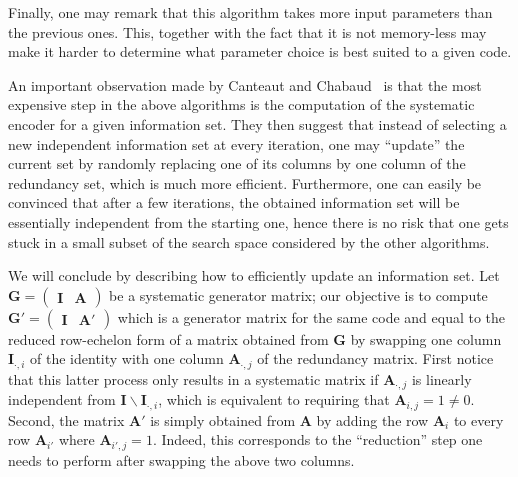 \documentclass[11pt,a4paper]{article}
\theoremstyle{definition}
\begin{document}
Finally, one may remark that this algorithm takes more input parameters than the previous ones. This, together with the fact that it is not memory-less may make it harder to
determine what parameter choice is best suited to a given code.

\medskip

An important observation made by Canteaut and Chabaud~\cite{CanteautChabaud} is that the most expensive step in the above algorithms is the computation of the systematic encoder for a given
information set. They then suggest that instead of selecting a new independent information set at every iteration, one may ``update'' the current set by randomly replacing one
of its columns by one column of the redundancy set, which is much more efficient. Furthermore, one can easily be convinced that after a few iterations, the obtained information
set will be essentially independent from the starting one, hence there is no risk that one gets stuck in a small subset of the search space considered by the other algorithms.

We will conclude by describing how to efficiently update an information set. Let $\bm{G} = \begin{pmatrix}\bm{I} & \bm{A}\end{pmatrix}$ be a systematic generator matrix;
our objective is to compute $\bm{G}' = \begin{pmatrix}\bm{I} & \bm{A}'\end{pmatrix}$ which is a generator matrix for the same code and equal to the
reduced row-echelon form of a matrix obtained from $\bm{G}$ by swapping one column $\bm{I}_{\cdot,i}$ of the identity with one column
$\bm{A}_{\cdot,j}$ of the redundancy matrix. First notice that this latter
process only results in a systematic matrix if $\bm{A}_{\cdot,j}$ is linearly independent from $\bm{I}\backslash\bm{I}_{\cdot,i}$, which is equivalent to
requiring that $\bm{A}_{i,j} = 1 \neq 0$. Second, the matrix $\bm{A}'$ is simply obtained from $\bm{A}$ by adding the row $\bm{A}_{i}$
to every row $\bm{A}_{i'}$ where $\bm{A}_{i',j} = 1$. Indeed, this corresponds to the ``reduction'' step one needs to perform after swapping the above two columns. 




\end{document}
